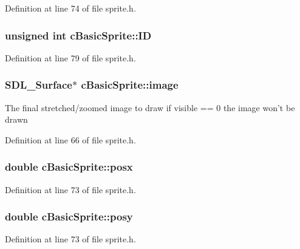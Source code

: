 Definition at line 74 of file sprite.\-h.

\hypertarget{classc_basic_sprite_a3afad558641ff5577c51c1b89cb1a871}{
\subsubsection[{I\-D}]{\setlength{\rightskip}{0pt plus 5cm}unsigned int c\-Basic\-Sprite\-::\-I\-D}}\label{classc_basic_sprite_a3afad558641ff5577c51c1b89cb1a871}


Definition at line 79 of file sprite.\-h.

\hypertarget{classc_basic_sprite_af504a7d23fed0ba6975f701e2a056dd7}{
\subsubsection[{image}]{\setlength{\rightskip}{0pt plus 5cm}S\-D\-L\-\_\-\-Surface$\ast$ c\-Basic\-Sprite\-::image}}\label{classc_basic_sprite_af504a7d23fed0ba6975f701e2a056dd7}
The final stretched/zoomed image to draw if visible == 0 the image won't be drawn 

Definition at line 66 of file sprite.\-h.

\hypertarget{classc_basic_sprite_a2c05526f8e98074b549e692822ab49b2}{
\subsubsection[{posx}]{\setlength{\rightskip}{0pt plus 5cm}double c\-Basic\-Sprite\-::posx}}\label{classc_basic_sprite_a2c05526f8e98074b549e692822ab49b2}


Definition at line 73 of file sprite.\-h.

\hypertarget{classc_basic_sprite_a9372069c238077090f0dd7a4e5c27e98}{
\subsubsection[{posy}]{\setlength{\rightskip}{0pt plus 5cm}double c\-Basic\-Sprite\-::posy}}\label{classc_basic_sprite_a9372069c238077090f0dd7a4e5c27e98}


Definition at line 73 of file sprite.\-h.

